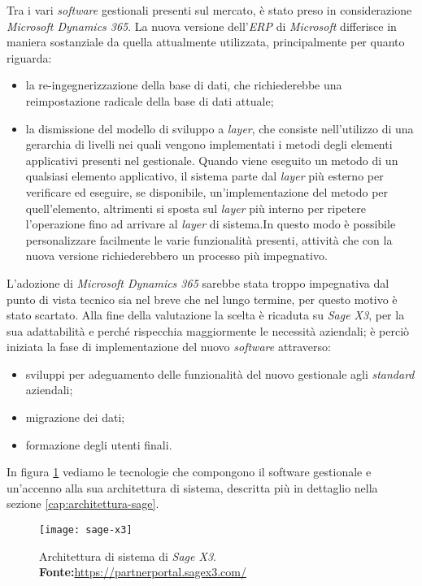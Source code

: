 Tra i vari \textit{software} gestionali presenti sul mercato, è stato preso in considerazione \textit{Microsoft Dynamics 365}. La nuova versione dell'\textit{ERP} di \textit{Microsoft} differisce in maniera sostanziale da quella attualmente utilizzata, principalmente per quanto riguarda:
\begin{itemize}
	\item la re-ingegnerizzazione della base di dati, che richiederebbe una reimpostazione radicale della base di dati attuale;
	\item la dismissione del modello di sviluppo a \textit{layer}, che consiste nell'utilizzo di una gerarchia di livelli nei quali vengono implementati i metodi degli elementi applicativi presenti nel gestionale. Quando viene eseguito un metodo di un qualsiasi elemento applicativo, il sistema parte dal \textit{layer} più esterno per verificare ed eseguire, se disponibile, un'implementazione del metodo per quell'elemento, altrimenti si sposta sul \textit{layer} più interno per ripetere l'operazione fino ad arrivare al \textit{layer} di sistema.In questo modo è possibile personalizzare facilmente le varie funzionalità presenti, attività che con la nuova versione richiederebbero un processo più impegnativo.
\end{itemize}
L'adozione di \textit{Microsoft Dynamics 365} sarebbe stata troppo impegnativa dal punto di vista tecnico sia nel breve che nel lungo termine, per questo motivo è stato scartato.
Alla fine della valutazione la scelta è ricaduta su \textit{Sage X3}, per la sua adattabilità e perché rispecchia maggiormente le necessità aziendali; è perciò iniziata la fase di implementazione del nuovo \textit{software} attraverso:

\begin{itemize}
	\item sviluppi per adeguamento delle funzionalità del nuovo gestionale agli\textit{ standard} aziendali;
	\item migrazione dei dati;
	\item formazione degli utenti finali.
\end{itemize}

In figura \ref{fig:arch-sage} vediamo le tecnologie che compongono il software gestionale e un'accenno alla sua architettura di sistema, descritta più in dettaglio nella sezione \ref{cap:architettura-sage}.

\vspace{10pt}
\begin{figure}[htbp]
	\begin{center}
		\texttt{[image: sage-x3]}
		\caption{Architettura di sistema di \textit{Sage X3}. \newline \textbf{Fonte:}\url{https://partnerportal.sagex3.com/}}
		\label{fig:arch-sage}
	\end{center}
\end{figure}
\vspace{30pt}


